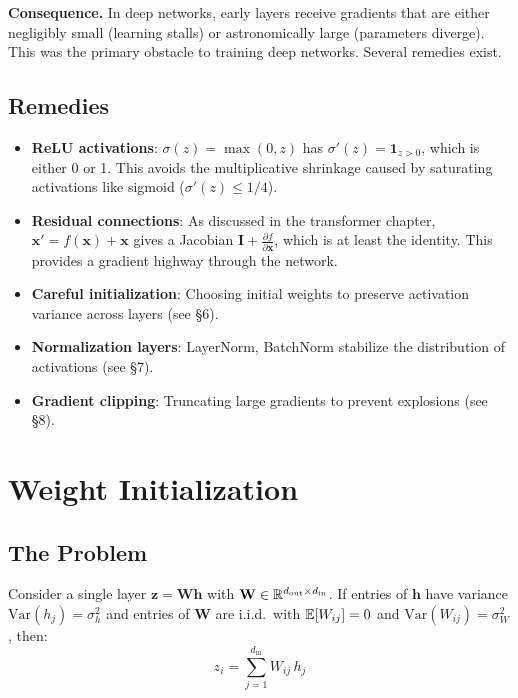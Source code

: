 \documentclass[main.tex]{subfiles}
\begin{document}
\textbf{Consequence.} In deep networks, early layers receive gradients that are either negligibly small (learning stalls) or astronomically large (parameters diverge). This was the primary obstacle to training deep networks. Several remedies exist.

\subsection{Remedies}

\begin{itemize}
    \item \textbf{ReLU activations}: $\sigma(z) = \max(0,z)$ has $\sigma'(z) = \mathbf{1}_{z > 0}$, which is either 0 or 1. This avoids the multiplicative shrinkage caused by saturating activations like sigmoid ($\sigma'(z) \leq 1/4$).
    \item \textbf{Residual connections}: As discussed in the transformer chapter, $\mathbf{x}' = f(\mathbf{x}) + \mathbf{x}$ gives a Jacobian $\mathbf{I} + \frac{\partial f}{\partial \mathbf{x}}$, which is at least the identity. This provides a gradient highway through the network.
    \item \textbf{Careful initialization}: Choosing initial weights to preserve activation variance across layers (see \S6).
    \item \textbf{Normalization layers}: LayerNorm, BatchNorm stabilize the distribution of activations (see \S7).
    \item \textbf{Gradient clipping}: Truncating large gradients to prevent explosions (see \S8).
\end{itemize}

\needspace{0.33\textheight}
\section{Weight Initialization}

\subsection{The Problem}

Consider a single layer $\mathbf{z} = \mathbf{W}\mathbf{h}$ with $\mathbf{W} \in \mathbb{R}^{d_{\text{out}} \times d_{\text{in}}}$. If entries of $\mathbf{h}$ have variance $\text{Var}(h_j) = \sigma_h^2$ and entries of $\mathbf{W}$ are i.i.d.\ with $\mathbb{E}[W_{ij}] = 0$ and $\text{Var}(W_{ij}) = \sigma_W^2$, then:
$$z_i = \sum_{j=1}^{d_{\text{in}}} W_{ij}\,h_j$$
\end{document}
